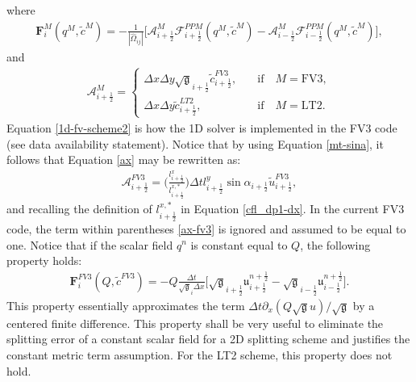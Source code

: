 \documentclass[preprint,12pt]{elsarticle}
\begin{document}
\begin{linenumbers}
\begin{equation}
\end{equation}
where
\begin{align}
	\label{F-operator}
	\mathbf{F}_{i}^M(q^M,\tilde{c}^{M}) =
	- \frac{1}{|\hat{\Omega}_{ij}|}
	\bigg[\mathcal{A}_{i+\frac{1}{2}}^M
	\mathcal{F}_{i+\frac{1}{2}}^{PPM}
	({{q}^M, \tilde{c}^{M}})-
	\mathcal{A}_{i-\frac{1}{2}}^M
	\mathcal{F}_{i-\frac{1}{2}}^{PPM}
	({{q}^M, \tilde{c}^{M}})\bigg],
\end{align}
and
\begin{align}
	\label{ax}
	\mathcal{A}_{i+\frac{1}{2}}^M = 
	\begin{cases}
		{\Delta x}{\Delta y}\sqrt{\mathfrak{g}}_{i+\frac{1}{2}} {\tilde{c}}_{i+\frac{1}{2}}^{FV3},
		\quad &\text{if} \quad M=\text{FV3},\\
		{\Delta x}{\Delta y}{\tilde{c}}_{i+\frac{1}{2}}^{LT2},
		\quad &\text{if} \quad M=\text{LT2}.
	\end{cases}
\end{align}
Equation \eqref{1d-fv-scheme2} is how the 1D solver is implemented in the FV3 code (see data availability statement). 
Notice that by using Equation \eqref{mt-sina}, it follows that Equation \eqref{ax} may be rewritten as:
\begin{align}
	\label{ax-fv3}
	\mathcal{A}_{i+\frac{1}{2}}^{FV3} = 
\bigg( \frac{{l}^x_{i+\frac{1}{2}}}{{l}^{x,*}_{i+\frac{1}{2}}}\bigg)
  		\Delta t
		l^y_{i+\frac{1}{2}} 
		\sin{\alpha_{i+\frac{1}{2}}}
        {\tilde{u}}_{i+\frac{1}{2}}^{FV3},
\end{align}
and recalling the definition of ${{l}^{x,*}_{i+\frac{1}{2}}}$ in Equation \eqref{cfl_dp1-dx}.
In the current FV3 code, the term within parentheses \eqref{ax-fv3} is ignored and assumed to be equal to one.
Notice that if the scalar field $q^n$ is constant equal to $Q$, the following property holds:
\begin{align}
	\label{F-operator-prop}
	\mathbf{F}_{i}^{FV3}(Q,\tilde{c}^{FV3}) =
	- Q\frac{\Delta t}{	\sqrt{\mathfrak{g}}_{i}\Delta x}
	\bigg[
	\sqrt{\mathfrak{g}}_{i+\frac{1}{2}}
	\mathfrak{u}_{i+\frac{1}{2}}^{n+\frac{1}{2}}-
	\sqrt{\mathfrak{g}}_{i-\frac{1}{2}}
	\mathfrak{u}_{i-\frac{1}{2}}^{n+\frac{1}{2}}\bigg].
\end{align}
This property essentially approximates the term $\Delta t\partial_x(Q{\sqrt{\mathfrak{g}}u})/\sqrt{\mathfrak{g}}$ by a centered finite difference. 
This property shall be very useful to eliminate the splitting error of a constant scalar field for a 2D splitting scheme and justifies the constant metric term assumption. 
For the LT2 scheme, this property does not hold.


\end{linenumbers}
\end{document}
